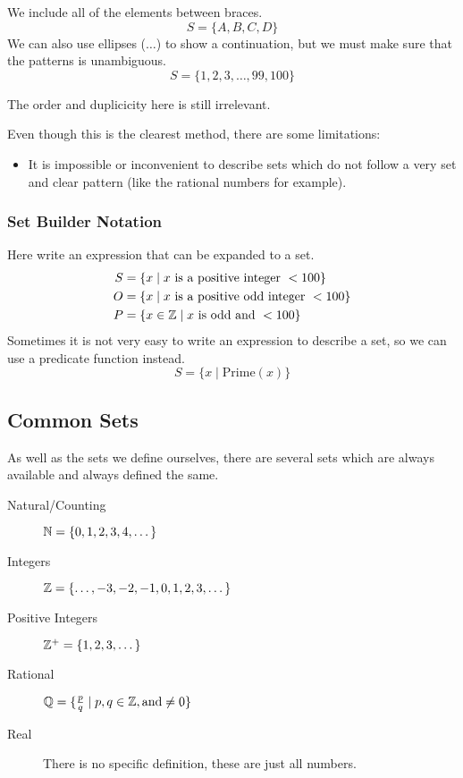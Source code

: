 We include all of the elements between braces.
\[
    S = \{A, B, C, D\}
\]
We can also use ellipses (\(\dots\)) to show a continuation, but we must make sure that the patterns is unambiguous.
\[
    S = \{1, 2, 3, \dots, 99, 100\}
\]
\begin{note}
    The order and duplicicity here is still irrelevant.
\end{note}
Even though this is the clearest method, there are some limitations:
\begin{itemize}
    \item It is impossible or inconvenient to describe sets which do not follow a very set and clear pattern (like the rational numbers for example).
\end{itemize}

\subsubsection{Set Builder Notation}\label{ssub:set_builder_notation}

Here write an expression that can be expanded to a set.
\begin{align*}
    S & = \{x \mid x \text{ is a positive integer } < 100\}     \\
    O & = \{x \mid x \text{ is a positive odd integer } < 100\} \\
    P & = \{x \in \mathbb{Z} \mid x \text{ is odd and } < 100\}
\end{align*}
Sometimes it is not very easy to write an expression to describe a set, so we can use a predicate function instead.
\[
    S=\{x \mid \mathrm{Prime}(x)\}
\]

\subsection{Common Sets}\label{sub:common_sets}

As well as the sets we define ourselves, there are several sets which are always available and always defined the same.

\begin{description}
    \item[Natural/Counting] \(\mathbb{N} = \{0, 1, 2, 3, 4, \dots\}\)
    \item[Integers] \(\mathbb{Z} = \{\dots, -3, -2, -1, 0, 1, 2, 3, \dots\}\)
    \item[Positive Integers] \(\mathbb{Z}^{+} = \{1, 2, 3, \dots\}\)
    \item[Rational] \(\mathbb{Q}=\{\frac{p}{q} \mid p, q \in \mathbb{Z}, \text{and} \neq 0\}\)
    \item[Real] There is no specific definition, these are just all numbers.
\end{description}

